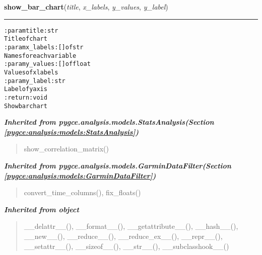     \label{pygce:analysis:models:TimelineDataAnalysis:show_bar_chart}

    \vspace{0.5ex}

\hspace{.8\funcindent}\begin{boxedminipage}{\funcwidth}

    \raggedright \textbf{show\_bar\_chart}(\textit{title}, \textit{x\_labels}, \textit{y\_values}, \textit{y\_label})

    \vspace{-1.5ex}

    \rule{\textwidth}{0.5\fboxrule}
\setlength{\parskip}{2ex}
\begin{alltt}

:param title: str
    Title of chart
:param x\_labels: [] of str
    Names for each variable
:param y\_values: [] of float
    Values of x labels
:param y\_label: str
    Label of y axis
:return: void
    Show bar chart
\end{alltt}

\setlength{\parskip}{1ex}
    \end{boxedminipage}


\large{\textbf{\textit{Inherited from pygce.analysis.models.StatsAnalysis\textit{(Section \ref{pygce:analysis:models:StatsAnalysis})}}}}

\begin{quote}
show\_correlation\_matrix()
\end{quote}

\large{\textbf{\textit{Inherited from pygce.analysis.models.GarminDataFilter\textit{(Section \ref{pygce:analysis:models:GarminDataFilter})}}}}

\begin{quote}
convert\_time\_columns(), fix\_floats()
\end{quote}

\large{\textbf{\textit{Inherited from object}}}

\begin{quote}
\_\_delattr\_\_(), \_\_format\_\_(), \_\_getattribute\_\_(), \_\_hash\_\_(), \_\_new\_\_(), \_\_reduce\_\_(), \_\_reduce\_ex\_\_(), \_\_repr\_\_(), \_\_setattr\_\_(), \_\_sizeof\_\_(), \_\_str\_\_(), \_\_subclasshook\_\_()
\end{quote}

